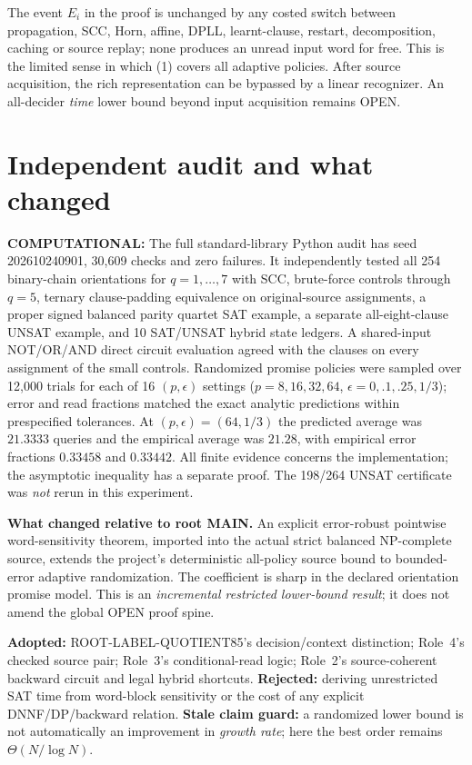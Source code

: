 \documentclass[11pt]{article}
\begin{document}
The event $E_i$ in the proof is unchanged by any costed switch between propagation, SCC, Horn, affine, DPLL, learnt-clause, restart, decomposition, caching or source replay; none produces an unread input word for free. This is the limited sense in which (1) covers all adaptive policies. After source acquisition, the rich representation can be bypassed by a linear recognizer. An all-decider \emph{time} lower bound beyond input acquisition remains OPEN.

\section{Independent audit and what changed}
\textbf{COMPUTATIONAL:} The full standard-library Python audit has seed 202610240901, 30,609 checks and zero failures. It independently tested all 254 binary-chain orientations for $q=1,\ldots,7$ with SCC, brute-force controls through $q=5$, ternary clause-padding equivalence on original-source assignments, a proper signed balanced parity quartet SAT example, a separate all-eight-clause UNSAT example, and 10 SAT/UNSAT hybrid state ledgers. A shared-input NOT/OR/AND direct circuit evaluation agreed with the clauses on every assignment of the small controls. Randomized promise policies were sampled over 12,000 trials for each of 16 $(p,\epsilon)$ settings ($p=8,16,32,64$, $\epsilon=0,.1,.25,1/3$); error and read fractions matched the exact analytic predictions within prespecified tolerances. At $(p,\epsilon)=(64,1/3)$ the predicted average was $21.3333$ queries and the empirical average was $21.28$, with empirical error fractions $0.33458$ and $0.33442$. All finite evidence concerns the implementation; the asymptotic inequality has a separate proof. The 198/264 UNSAT certificate was \emph{not} rerun in this experiment.

\noindent\textbf{What changed relative to root MAIN.}
An explicit error-robust pointwise word-sensitivity theorem, imported into the actual strict balanced NP-complete source, extends the project's deterministic all-policy source bound to bounded-error adaptive randomization. The coefficient is sharp in the declared orientation promise model. This is an \emph{incremental restricted lower-bound result}; it does not amend the global OPEN proof spine.

\noindent\textbf{Adopted:} ROOT-LABEL-QUOTIENT85's decision/context distinction; Role~4's checked source pair; Role~3's conditional-read logic; Role~2's source-coherent backward circuit and legal hybrid shortcuts. \textbf{Rejected:} deriving unrestricted SAT time from word-block sensitivity or the cost of any explicit DNNF/DP/backward relation. \textbf{Stale claim guard:} a randomized lower bound is not automatically an improvement in \emph{growth rate}; here the best order remains $\Theta(N/\log N)$.
\end{document}
